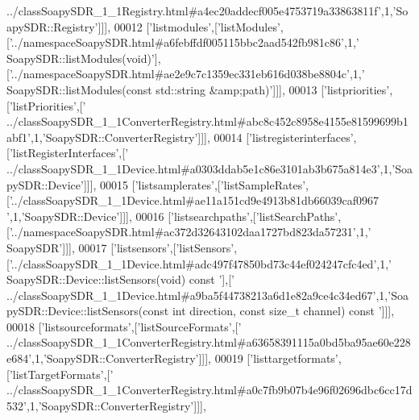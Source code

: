 \begin{DoxyCode}
{      ../classSoapySDR\_1\_1Registry.html#a4ec20addecf005e4753719a33863811f'},1,\textcolor{stringliteral}{'SoapySDR::Registry'}]]],
00012   [\textcolor{stringliteral}{'listmodules'},[\textcolor{stringliteral}{'listModules'},[\textcolor{stringliteral}{'../namespaceSoapySDR.html#a6febffdf005115bbc2aad542fb981c86'},1,\textcolor{stringliteral}{'
      SoapySDR::listModules(void)'}],[\textcolor{stringliteral}{'../namespaceSoapySDR.html#ae2e9c7c1359ec331eb616d038be8804c'},1,\textcolor{stringliteral}{'
      SoapySDR::listModules(const std::string &amp;path)'}]]],
00013   [\textcolor{stringliteral}{'listpriorities'},[\textcolor{stringliteral}{'listPriorities'},[\textcolor{stringliteral}{'
      ../classSoapySDR\_1\_1ConverterRegistry.html#abc8c452c8958e4155e81599699b1abf1'},1,\textcolor{stringliteral}{'SoapySDR::ConverterRegistry'}]]],
00014   [\textcolor{stringliteral}{'listregisterinterfaces'},[\textcolor{stringliteral}{'listRegisterInterfaces'},[\textcolor{stringliteral}{'
      ../classSoapySDR\_1\_1Device.html#a0303ddab5e1c86e3101ab3b675a814e3'},1,\textcolor{stringliteral}{'SoapySDR::Device'}]]],
00015   [\textcolor{stringliteral}{'listsamplerates'},[\textcolor{stringliteral}{'listSampleRates'},[\textcolor{stringliteral}{'../classSoapySDR\_1\_1Device.html#ae11a151cd9e4913b81db66039caf0967
      '},1,\textcolor{stringliteral}{'SoapySDR::Device'}]]],
00016   [\textcolor{stringliteral}{'listsearchpaths'},[\textcolor{stringliteral}{'listSearchPaths'},[\textcolor{stringliteral}{'../namespaceSoapySDR.html#ac372d32643102daa1727bd823da57231'},1,\textcolor{stringliteral}{'
      SoapySDR'}]]],
00017   [\textcolor{stringliteral}{'listsensors'},[\textcolor{stringliteral}{'listSensors'},[\textcolor{stringliteral}{'../classSoapySDR\_1\_1Device.html#adc497f47850bd73c44ef024247cfc4ed'},1,\textcolor{stringliteral}{'
      SoapySDR::Device::listSensors(void) const '}],[\textcolor{stringliteral}{'
      ../classSoapySDR\_1\_1Device.html#a9ba5f44738213a6d1e82a9ce4c34ed67'},1,\textcolor{stringliteral}{'SoapySDR::Device::listSensors(const int direction, const size\_t channel) const '}]]],
00018   [\textcolor{stringliteral}{'listsourceformats'},[\textcolor{stringliteral}{'listSourceFormats'},[\textcolor{stringliteral}{'
      ../classSoapySDR\_1\_1ConverterRegistry.html#a63658391115a0bd5ba95ae60e228e684'},1,\textcolor{stringliteral}{'SoapySDR::ConverterRegistry'}]]],
00019   [\textcolor{stringliteral}{'listtargetformats'},[\textcolor{stringliteral}{'listTargetFormats'},[\textcolor{stringliteral}{'
      ../classSoapySDR\_1\_1ConverterRegistry.html#a0c7fb9b07b4e96f02696dbc6cc17d532'},1,\textcolor{stringliteral}{'SoapySDR::ConverterRegistry'}]]],

\end{DoxyCode}
